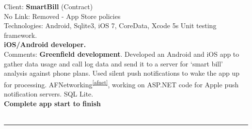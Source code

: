 \documentclass{article}
\begin{document}
Client: 	\textbf  {SmartBill} (Contract) \\
No Link: Removed - App Store policies \\
Technologies: 	Android, Sqlite3, iOS 7, CoreData, Xcode 5s Unit testing framework.  \\
\textbf{ iOS/Android developer.  }\\
Comments:	\textbf { Greenfield development}. Developed an Android and iOS app to gather data usage and call log data and send it to a server for ‘smart bill’ analysis against phone plans. Used silent push notifications to wake the app up for processing. AFNetworking\textsuperscript{\ref{afnet}}, working on ASP.NET code for Apple push notification servers. SQL Lite. \\
\textbf{Complete app start to finish} \\
\\


\noindent\hfil\rule{0.5\textwidth}{.4pt}\hfil
\\

%
\end{document}
